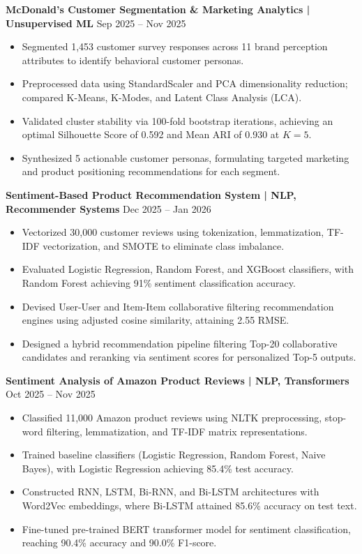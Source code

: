 \documentclass[10pt]{article}
\begin{document}
\textbf{McDonald's Customer Segmentation \& Marketing Analytics | Unsupervised ML} \hfill Sep 2025 -- Nov 2025
\begin{itemize}[noitemsep, topsep=2pt, partopsep=0pt, parsep=1.5pt]
    \item Segmented 1,453 customer survey responses across 11 brand perception attributes to identify behavioral customer personas.
    \item Preprocessed data using StandardScaler and PCA dimensionality reduction; compared K-Means, K-Modes, and Latent Class Analysis (LCA).
    \item Validated cluster stability via 100-fold bootstrap iterations, achieving an optimal Silhouette Score of 0.592 and Mean ARI of 0.930 at $K=5$.
    \item Synthesized 5 actionable customer personas, formulating targeted marketing and product positioning recommendations for each segment.
\end{itemize}

\vspace{6pt}

\textbf{Sentiment-Based Product Recommendation System | NLP, Recommender Systems} \hfill Dec 2025 -- Jan 2026
\begin{itemize}[noitemsep, topsep=2pt, partopsep=0pt, parsep=1.5pt]
    \item Vectorized 30,000 customer reviews using tokenization, lemmatization, TF-IDF vectorization, and SMOTE to eliminate class imbalance.
    \item Evaluated Logistic Regression, Random Forest, and XGBoost classifiers, with Random Forest achieving 91\% sentiment classification accuracy.
    \item Devised User-User and Item-Item collaborative filtering recommendation engines using adjusted cosine similarity, attaining 2.55 RMSE.
    \item Designed a hybrid recommendation pipeline filtering Top-20 collaborative candidates and reranking via sentiment scores for personalized Top-5 outputs.
\end{itemize}

\vspace{6pt}

\textbf{Sentiment Analysis of Amazon Product Reviews | NLP, Transformers} \hfill Oct 2025 -- Nov 2025
\begin{itemize}[noitemsep, topsep=2pt, partopsep=0pt, parsep=1.5pt]
    \item Classified 11,000 Amazon product reviews using NLTK preprocessing, stop-word filtering, lemmatization, and TF-IDF matrix representations.
    \item Trained baseline classifiers (Logistic Regression, Random Forest, Naive Bayes), with Logistic Regression achieving 85.4\% test accuracy.
    \item Constructed RNN, LSTM, Bi-RNN, and Bi-LSTM architectures with Word2Vec embeddings, where Bi-LSTM attained 85.6\% accuracy on test text.
    \item Fine-tuned pre-trained BERT transformer model for sentiment classification, reaching 90.4\% accuracy and 90.0\% F1-score.
\end{itemize}
\end{document}
